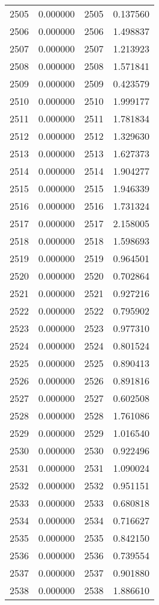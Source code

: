 \documentclass[12pt]{article}
\begin{document}
\begin{longtable}{@{}cccc@{}}
2505 & 0.000000 & 2505 & 0.137560 \\
2506 & 0.000000 & 2506 & 1.498837 \\
2507 & 0.000000 & 2507 & 1.213923 \\
2508 & 0.000000 & 2508 & 1.571841 \\
2509 & 0.000000 & 2509 & 0.423579 \\
2510 & 0.000000 & 2510 & 1.999177 \\
2511 & 0.000000 & 2511 & 1.781834 \\
2512 & 0.000000 & 2512 & 1.329630 \\
2513 & 0.000000 & 2513 & 1.627373 \\
2514 & 0.000000 & 2514 & 1.904277 \\
2515 & 0.000000 & 2515 & 1.946339 \\
2516 & 0.000000 & 2516 & 1.731324 \\
2517 & 0.000000 & 2517 & 2.158005 \\
2518 & 0.000000 & 2518 & 1.598693 \\
2519 & 0.000000 & 2519 & 0.964501 \\
2520 & 0.000000 & 2520 & 0.702864 \\
2521 & 0.000000 & 2521 & 0.927216 \\
2522 & 0.000000 & 2522 & 0.795902 \\
2523 & 0.000000 & 2523 & 0.977310 \\
2524 & 0.000000 & 2524 & 0.801524 \\
2525 & 0.000000 & 2525 & 0.890413 \\
2526 & 0.000000 & 2526 & 0.891816 \\
2527 & 0.000000 & 2527 & 0.602508 \\
2528 & 0.000000 & 2528 & 1.761086 \\
2529 & 0.000000 & 2529 & 1.016540 \\
2530 & 0.000000 & 2530 & 0.922496 \\
2531 & 0.000000 & 2531 & 1.090024 \\
2532 & 0.000000 & 2532 & 0.951151 \\
2533 & 0.000000 & 2533 & 0.680818 \\
2534 & 0.000000 & 2534 & 0.716627 \\
2535 & 0.000000 & 2535 & 0.842150 \\
2536 & 0.000000 & 2536 & 0.739554 \\
2537 & 0.000000 & 2537 & 0.901880 \\
2538 & 0.000000 & 2538 & 1.886610 \\

\end{longtable}
\end{document}
